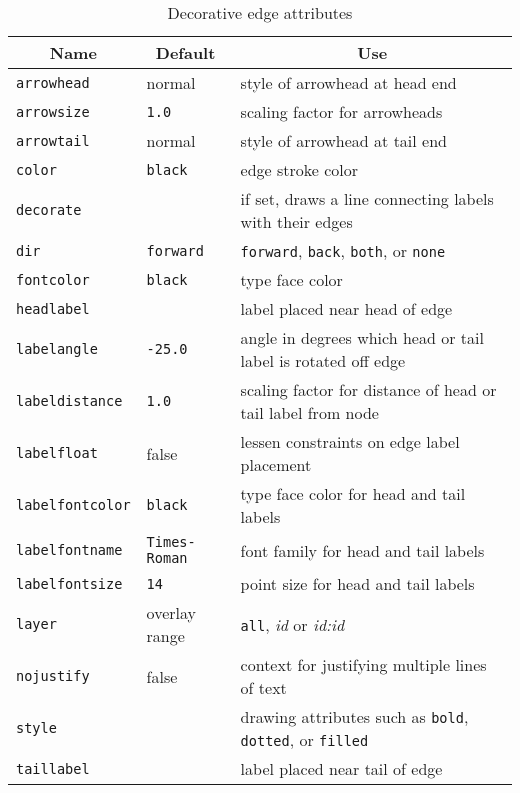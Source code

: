 \begin{table}[htbp]\footnotesize
\centering
\begin{tabular}[t]{|l|l|p{2.5in}|} \hline
\multicolumn{1}{|c|}{Name} & \multicolumn{1}{c|}{Default} & \multicolumn{1}{c|}{Use} \\ \hline
{\tt arrowhead} & normal & style of arrowhead at head end \\
{\tt arrowsize} & {\tt 1.0} & scaling factor for arrowheads \\
{\tt arrowtail} & normal & style of arrowhead at tail end \\
{\tt color} & {\tt black} & edge stroke color \\
{\tt decorate} & & if set, draws a line connecting labels with their edges \\
{\tt dir} & {\tt forward} & {\tt forward}, {\tt back}, {\tt both}, or {\tt none} \\ 
{\tt fontcolor} & {\tt black} & type face color \\
{\tt headlabel} & & label placed near head of edge \\
{\tt labelangle} & {\tt -25.0} & angle in degrees which head or tail label
is rotated off edge \\
{\tt labeldistance} & {\tt 1.0} & scaling factor for distance of head or tail label from node \\
{\tt labelfloat} & false & lessen constraints on edge label placement \\
{\tt labelfontcolor} & {\tt black} & type face color for head and tail labels\\
{\tt labelfontname} & {\tt Times-Roman} & font family for head and tail labels\\
{\tt labelfontsize} & {\tt 14} & point size for head and tail labels \\
{\tt layer} & overlay range & {\tt all}, {\it id} or {\it id:id} \\
{\tt nojustify} & false & context for justifying multiple lines of text \\
{\tt style} & & drawing attributes such as {\tt bold}, {\tt dotted}, or {\tt filled} \\ 
{\tt taillabel} & & label placed near tail of edge \\
\hline
\end{tabular}
\caption{Decorative edge attributes}
\label{tab:eattr_dec}
\end{table}
